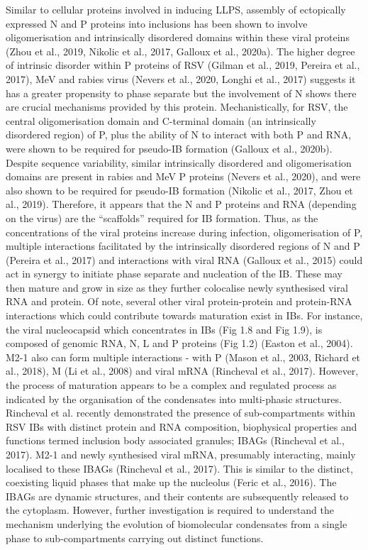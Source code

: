 Similar to cellular proteins involved in inducing LLPS, assembly of ectopically expressed N and P proteins into inclusions has been shown to involve oligomerisation and intrinsically disordered domains within these viral proteins (Zhou et al., 2019, Nikolic et al., 2017, Galloux et al., 2020a). The higher degree of intrinsic disorder within P proteins of RSV (Gilman et al., 2019, Pereira et al., 2017), MeV and rabies virus (Nevers et al., 2020, Longhi et al., 2017) suggests it has a greater propensity to phase separate but the involvement of N shows there are crucial mechanisms provided by this protein. Mechanistically, for RSV, the central oligomerisation domain and C-terminal domain (an intrinsically disordered region) of P, plus the ability of N to interact with both P and RNA, were shown to be required for pseudo-IB formation (Galloux et al., 2020b). Despite sequence variability, similar intrinsically disordered and oligomerisation domains are present in rabies and MeV P proteins (Nevers et al., 2020), and were also shown to be required for pseudo-IB formation (Nikolic et al., 2017, Zhou et al., 2019). Therefore, it appears that the N and P proteins and RNA (depending on the virus) are the “scaffolds” required for IB formation. Thus, as the concentrations of the viral proteins increase during infection, oligomerisation of P, multiple interactions facilitated by the intrinsically disordered regions of N and P (Pereira et al., 2017) and interactions with viral RNA (Galloux et al., 2015) could act in synergy to initiate phase separate and nucleation of the IB. These may then mature and grow in size as they further colocalise newly synthesised viral RNA and protein. Of note, several other viral protein-protein and protein-RNA interactions which could contribute towards maturation exist in IBs. For instance, the viral nucleocapsid which concentrates in IBs (Fig 1.8 and Fig 1.9), is composed of genomic RNA, N, L and P proteins (Fig 1.2) (Easton et al., 2004). M2-1 also can form multiple interactions - with P (Mason et al., 2003, Richard et al., 2018), M (Li et al., 2008) and viral mRNA (Rincheval et al., 2017). However, the process of maturation appears to be a complex and regulated process as indicated by the organisation of the condensates into multi-phasic structures. Rincheval et al. recently demonstrated the presence of sub-compartments within RSV IBs with distinct protein and RNA composition, biophysical properties and functions termed inclusion body associated granules; IBAGs (Rincheval et al., 2017). M2-1 and newly synthesised viral mRNA, presumably interacting, mainly localised to these IBAGs (Rincheval et al., 2017). This is similar to the distinct, coexisting liquid phases that make up the nucleolus (Feric et al., 2016). The IBAGs are dynamic structures, and their contents are subsequently released to the cytoplasm. However, further investigation is required to understand the mechanism underlying the evolution of biomolecular condensates from a single phase to sub-compartments carrying out distinct functions.

